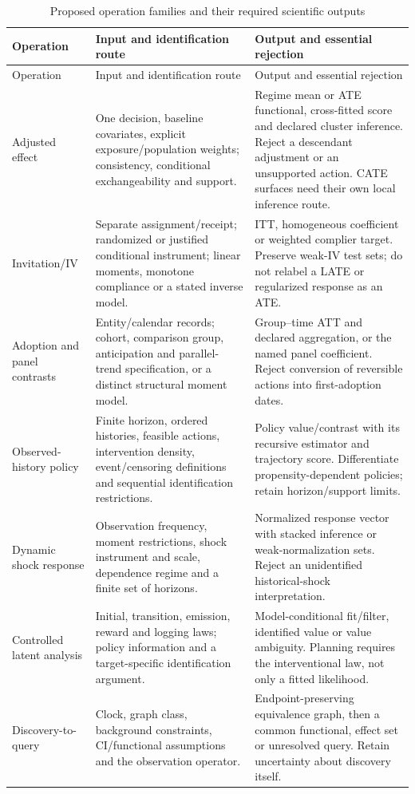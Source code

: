 \begin{longtable}{P{.16\textwidth}P{.38\textwidth}P{.39\textwidth}}
\caption{Proposed operation families and their required scientific outputs}
\label{r3:operations}\\
\toprule
Operation & Input and identification route & Output and essential rejection\\
\midrule\endfirsthead
\toprule Operation & Input and identification route & Output and essential rejection\\
\midrule\endhead
Adjusted effect &
One decision, baseline covariates, explicit exposure/population weights;
consistency, conditional exchangeability and support. &
Regime mean or ATE functional, cross-fitted score and declared cluster
inference. Reject a descendant adjustment or an unsupported action.
CATE surfaces need their own local inference route.\\
Invitation/IV &
Separate assignment/receipt; randomized or justified conditional instrument;
linear moments, monotone compliance or a stated inverse model. &
ITT, homogeneous coefficient or weighted complier target. Preserve weak-IV
test sets; do not relabel a LATE or regularized response as an ATE.\\
Adoption and panel contrasts &
Entity/calendar records; cohort, comparison group, anticipation and
parallel-trend specification, or a distinct structural moment model. &
Group--time ATT and declared aggregation, or the named panel coefficient.
Reject conversion of reversible actions into first-adoption dates.\\
Observed-history policy &
Finite horizon, ordered histories, feasible actions, intervention density,
event/censoring definitions and sequential identification restrictions. &
Policy value/contrast with its recursive estimator and trajectory score.
Differentiate propensity-dependent policies; retain horizon/support limits.\\
Dynamic shock response &
Observation frequency, moment restrictions, shock instrument and scale,
dependence regime and a finite set of horizons. &
Normalized response vector with stacked inference or weak-normalization
sets. Reject an unidentified historical-shock interpretation.\\
Controlled latent analysis &
Initial, transition, emission, reward and logging laws; policy information
and a target-specific identification argument. &
Model-conditional fit/filter, identified value or value ambiguity.
Planning requires the interventional law, not only a fitted likelihood.\\
Discovery-to-query &
Clock, graph class, background constraints, CI/functional assumptions and
the observation operator. &
Endpoint-preserving equivalence graph, then a common functional, effect set
or unresolved query. Retain uncertainty about discovery itself.\\
\bottomrule
\end{longtable}

